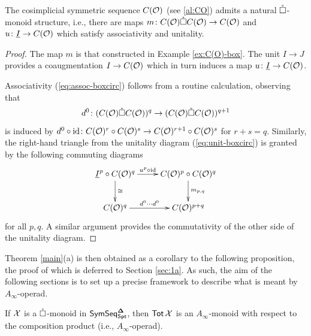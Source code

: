 \begin{proposition}
    \label{def:box-circ-prod-map}
    The cosimplicial symmetric sequence $C(\mathcal{O})$ (see \eqref{al:CO}) admits a natural $\mathring{\square}$-monoid structure, i.e., there are maps $m\colon C(\mathcal{O})\mathring{\square} C(\mathcal{O})\to C(\mathcal{O})$ and $u \colon \underline{I}\to C(\mathcal{O})$ which satisfy associativity and unitality. 
\end{proposition}

\begin{proof}
    The map $m$ is that constructed in Example \ref{ex:C(O)-box}. The unit $I\to J$ provides a coaugmentation $I\to C(\mathcal{O})$ which in turn induces a map $u\colon \underline{I}\to C(\mathcal{O})$. 
    
    Associativity (\ref{eq:assoc-boxcirc}) follows from a routine calculation, observing that \[d^0 \colon (C(\mathcal{O}) \mathring{\square} C(\mathcal{O}))^{q} \to (C(\mathcal{O}) \mathring{\square} C(\mathcal{O}))^{q+1}\] is induced by $d^0 \circ \mathrm{id}\colon C(\mathcal{O})^r\circ C(\mathcal{O})^s\to C(\mathcal{O})^{r+1} \circ C(\mathcal{O})^s$ for $r+s=q$. Similarly, the right-hand triangle from the unitality diagram (\ref{eq:unit-boxcirc}) is granted by the following commuting diagrams\[ \xymatrix{
        \underline{I}^p \circ C(\Cal{O})^q \ar[r]^-{u^p\circ \id} \ar[d]^-{\cong}
        & 
        C(\Cal{O})^p \circ \fco^q \ar[d]^-{m_{p,q}}
        \\ 
        \fco^q \ar[r]^-{d^0\cdots d^0} 
        & 
        \fco^{p+q}
        }\]
    for all $p,q$. A similar argument provides the commutativity of the other side of the unitality diagram. 
\end{proof}

Theorem \ref{main}(a) is then obtained as a corollary to the following proposition, the proof of which is deferred to Section \ref{sec:1a}. As such, the aim of the following sections is to set up a precise framework to describe what is meant by $A_{\infty}$-operad.

\begin{proposition}  \label{main-1}
    If $\mathcal{X}$ is a $\mathring{\square}$-monoid in $\mathsf{SymSeq}_{\mathsf{Spt}}^{\mathbf{\Delta}}$, then $\operatorname{\mathsf{Tot}} \mathcal{X}$ is an $A_{\infty}$-monoid with respect to the composition product (i.e., $A_{\infty}$-operad). 
\end{proposition}